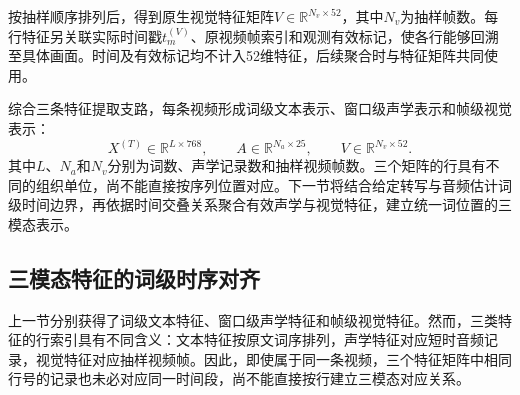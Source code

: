 按抽样顺序排列后，得到原生视觉特征矩阵$V\in\mathbb{R}^{N_v\times52}$，其中$N_v$为抽样帧数。每行特征另关联实际时间戳$t_m^{(V)}$、原视频帧索引和观测有效标记，使各行能够回溯至具体画面。时间及有效标记均不计入52维特征，后续聚合时与特征矩阵共同使用。

综合三条特征提取支路，每条视频形成词级文本表示、窗口级声学表示和帧级视觉表示：
\begin{equation}
    X^{(T)}\in\mathbb{R}^{L\times768},\qquad
    A\in\mathbb{R}^{N_a\times25},\qquad
    V\in\mathbb{R}^{N_v\times52}.
    \label{eq:p1_native_features}
\end{equation}
其中$L$、$N_a$和$N_v$分别为词数、声学记录数和抽样视频帧数。三个矩阵的行具有不同的组织单位，尚不能直接按序列位置对应。下一节将结合给定转写与音频估计词级时间边界，再依据时间交叠关系聚合有效声学与视觉特征，建立统一词位置的三模态表示。







\subsection{三模态特征的词级时序对齐}


上一节分别获得了词级文本特征、窗口级声学特征和帧级视觉特征。然而，三类特征的行索引具有不同含义：文本特征按原文词序排列，声学特征对应短时音频记录，视觉特征对应抽样视频帧。因此，即使属于同一条视频，三个特征矩阵中相同行号的记录也未必对应同一时间段，尚不能直接按行建立三模态对应关系。

